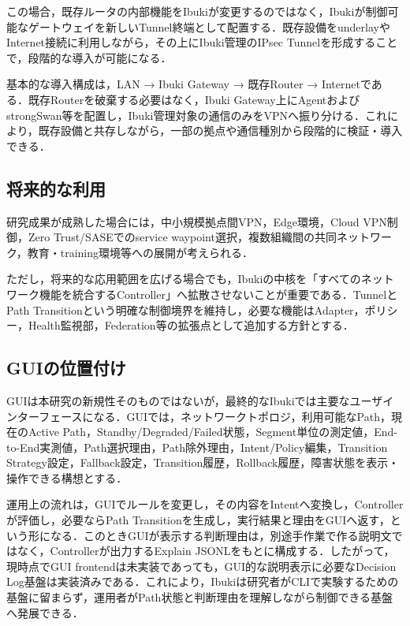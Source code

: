 \documentclass[11pt,a4paper,twoside]{ltjsarticle}
\begin{document}
この場合，既存ルータの内部機能をIbukiが変更するのではなく，Ibukiが制御可能なゲートウェイを新しいTunnel終端として配置する．既存設備をunderlayやInternet接続に利用しながら，その上にIbuki管理のIPsec Tunnelを形成することで，段階的な導入が可能になる．

基本的な導入構成は，LAN → Ibuki Gateway → 既存Router → Internetである．既存Routerを破棄する必要はなく，Ibuki Gateway上にAgentおよびstrongSwan等を配置し，Ibuki管理対象の通信のみをVPNへ振り分ける．これにより，既存設備と共存しながら，一部の拠点や通信種別から段階的に検証・導入できる．

\subsection{将来的な利用}

研究成果が成熟した場合には，中小規模拠点間VPN，Edge環境，Cloud VPN制御，Zero Trust/SASEでのservice waypoint選択，複数組織間の共同ネットワーク，教育・training環境等への展開が考えられる．

ただし，将来的な応用範囲を広げる場合でも，Ibukiの中核を「すべてのネットワーク機能を統合するController」へ拡散させないことが重要である．TunnelとPath Transitionという明確な制御境界を維持し，必要な機能はAdapter，ポリシー，Health監視部，Federation等の拡張点として追加する方針とする．

\subsection{GUIの位置付け}
GUIは本研究の新規性そのものではないが，最終的なIbukiでは主要なユーザインターフェースになる．GUIでは，ネットワークトポロジ，利用可能なPath，現在のActive Path，Standby/Degraded/Failed状態，Segment単位の測定値，End-to-End実測値，Path選択理由，Path除外理由，Intent/Policy編集，Transition Strategy設定，Fallback設定，Transition履歴，Rollback履歴，障害状態を表示・操作できる構想とする．

運用上の流れは，GUIでルールを変更し，その内容をIntentへ変換し，Controllerが評価し，必要ならPath Transitionを生成し，実行結果と理由をGUIへ返す，という形になる．このときGUIが表示する判断理由は，別途手作業で作る説明文ではなく，Controllerが出力するExplain JSONLをもとに構成する．したがって，現時点でGUI frontendは未実装であっても，GUI的な説明表示に必要なDecision Log基盤は実装済みである．これにより，Ibukiは研究者がCLIで実験するための基盤に留まらず，運用者がPath状態と判断理由を理解しながら制御できる基盤へ発展できる．
\end{document}
